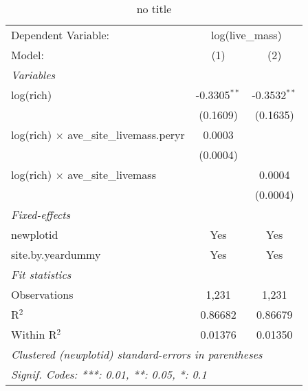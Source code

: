 
\begin{table}[htbp]
   \caption{no title}
   \centering
   \begin{tabular}{lcc}
      \tabularnewline \midrule \midrule
      Dependent Variable: & \multicolumn{2}{c}{log(live\_mass)}\\
      Model:                                          & (1)            & (2)\\  
      \midrule
      \emph{Variables}\\
      log(rich)                                       & -0.3305$^{**}$ & -0.3532$^{**}$\\   
                                                      & (0.1609)       & (0.1635)\\   
      log(rich) $\times$ ave\_site\_livemass.peryr    & 0.0003         &   \\   
                                                      & (0.0004)       &   \\   
      log(rich) $\times$ ave\_site\_livemass          &                & 0.0004\\   
                                                      &                & (0.0004)\\   
      \midrule
      \emph{Fixed-effects}\\
      newplotid                                       & Yes            & Yes\\  
      site.by.yeardummy                               & Yes            & Yes\\  
      \midrule
      \emph{Fit statistics}\\
      Observations                                    & 1,231          & 1,231\\  
      R$^2$                                           & 0.86682        & 0.86679\\  
      Within R$^2$                                    & 0.01376        & 0.01350\\  
      \midrule \midrule
      \multicolumn{3}{l}{\emph{Clustered (newplotid) standard-errors in parentheses}}\\
      \multicolumn{3}{l}{\emph{Signif. Codes: ***: 0.01, **: 0.05, *: 0.1}}\\
   \end{tabular}
\end{table}


